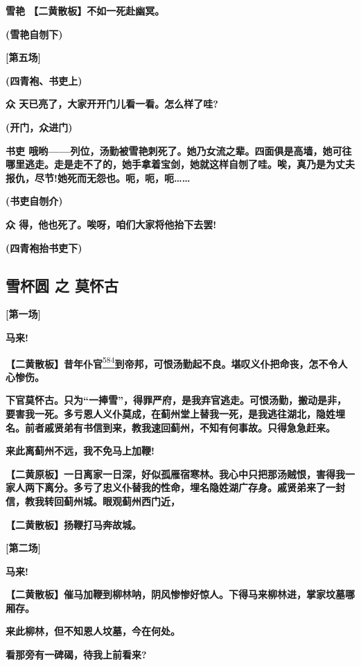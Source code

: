 \textbf{雪艳 【二黄散板】不如一死赴幽冥。}

\textbf{(雪艳自刎下)}

\textbf{{[}第五场{]}}

\textbf{(四青袍、书吏上)}

\textbf{众 天已亮了，大家开开门儿看一看。怎么样了哇?}

\textbf{(开门，众进门)}

\textbf{书吏
哦哟------列位，汤勤被雪艳刺死了。她乃女流之辈。四面俱是高墙，她可往哪里逃走。走是走不了的，她手拿着宝剑，她就这样自刎了哇。唉，真乃是为丈夫报仇，尽节!她死而无怨也。呃，呃，呃\ldots{}\ldots{}}

\textbf{(书吏自刎介)}

\textbf{众 得，他也死了。唉呀，咱们大家将他抬下去罢!}

\textbf{(四青袍抬书吏下)}

\hypertarget{ux96eaux676fux5706-ux4e4b-ux83abux6000ux53e4}{%
\subsection{雪杯圆 之
莫怀古}\label{ux96eaux676fux5706-ux4e4b-ux83abux6000ux53e4}}

\textbf{{[}第一场{]}}

\textbf{马来!}

\textbf{【二黄散板】昔年仆官}\protect\hyperlink{fn584}{\textsuperscript{584}}\textbf{到帝邦，可恨汤勤起不良。堪叹义仆把命丧，怎不令人心惨伤。}

\textbf{下官莫怀古。只为``一捧雪''，得罪严府，是我弃官逃走。可恨汤勤，搬动是非，要害我一死。多亏恩人义仆莫成，在蓟州堂上替我一死，是我逃往湖北，隐姓埋名。前者戚贤弟有书信到来，教我速回蓟州，不知有何事故。只得急急赶来。}

\textbf{来此离蓟州不远，我不免马上加鞭!}

\textbf{【二黄原板】一日离家一日深，好似孤雁宿寒林。我心中只把那汤贼恨，害得我一家人两下离分。多亏了忠义仆替我的性命，埋名隐姓湖广存身。戚贤弟来了一封信，教我转回蓟州城。眼观蓟州西门近，}

\textbf{【二黄散板】扬鞭打马奔故城。}

\textbf{{[}第二场{]}}

\textbf{马来!}

\textbf{【二黄散板】催马加鞭到柳林呐，阴风惨惨好惊人。下得马来柳林进，掌家坟墓哪厢存。}

\textbf{来此柳林，但不知恩人坟墓，今在何处。}

\textbf{看那旁有一碑碣，待我上前看来?}

